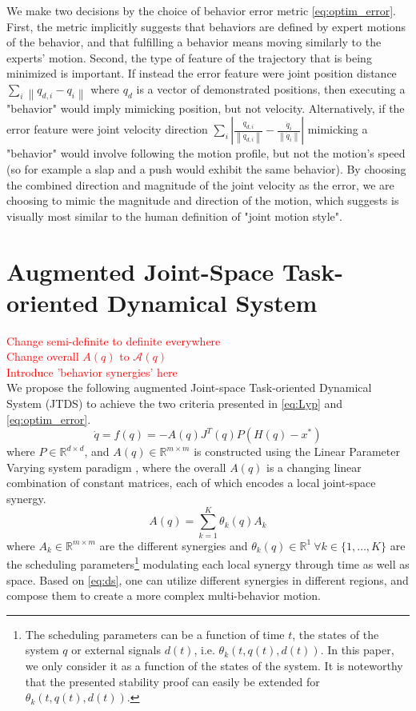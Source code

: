 \documentclass[letterpaper, 10 pt, conference,fleqn]{ieeeconf}
\begin{document}
We make two decisions by the choice of behavior error metric \eqref{eq:optim_error}. First, the metric implicitly suggests that behaviors are defined by expert motions of the behavior, and that fulfilling a behavior means moving similarly to the experts' motion. Second, the type of feature of the trajectory that is being minimized is important. If instead the error feature were joint position distance $\sum_i\left \| q_{d,i} - q_i \right \|$ where $q_d$ is a vector of demonstrated positions, then executing a "behavior" would imply mimicking position, but not velocity. Alternatively, if the error feature were joint velocity direction $\sum_i \left | \frac{\dot{q}_{d,i}}{\left \| \dot{q}_{d,i} \right \|} - \frac{\dot{q}_i}{\left \| \dot{q}_i \right \|} \right |$ mimicking a "behavior" would involve following the motion profile, but not the motion's speed (so for example a slap and a push would exhibit the same behavior). By choosing the combined direction and magnitude of the joint velocity as the error, we are choosing to mimic the magnitude and direction of the motion, which \cite{gielniak2010stylized} suggests is visually most similar to the human definition of "joint motion style".
\section{Augmented \textbf{J}oint-Space \textbf{T}ask-oriented \textbf{D}ynamical \textbf{S}ystem} \label{Sec:DS}
\label{sec:proposed_system}
\textcolor{red}{Change semi-definite to definite everywhere\\Change overall $A(q)$ to $\mathcal{A}(q)$\\ Introduce 'behavior synergies' here\\}
We propose the following augmented Joint-space Task-oriented Dynamical System (JTDS) to achieve the two criteria presented in \ref{eq:Lyp} and \ref{eq:optim_error}.
\begin{equation}
\label{eq:ds}
\dot{q} = f(q) = -A(q)J^T(q)P(H(q) - x^*)
\end{equation}
where $P\in \mathbb{R}^{d\times d}$, and $A(q)\in \mathbb{R}^{m\times m}$ is constructed using the Linear Parameter Varying system paradigm \cite{emedi2016fixed,7439839}, where the overall $A(q)$ is a changing linear combination of constant  matrices, each of which encodes a local joint-space synergy. 
\begin{equation}
\label{eq:A_def}
A(q) = \sum_{k=1}^{K}\theta_k(q)A_k 
\end{equation}
where $A_k\in \mathbb{R}^{m\times m} $ are the different synergies and $\theta_k(q)\in \mathbb{R}^{1}~\forall k\in\{1,\dots,K\} $ are the scheduling parameters\footnote{The scheduling parameters can be a function of time $t$, the states of the
system $q $ or external signals $d(t)$, i.e. $\theta_k (t, q(t), d(t))$. In this paper, we only consider it as a function of the states of the system. It is noteworthy that the presented stability proof can easily be extended for $\theta_k (t, q(t), d(t))$.} modulating each local synergy through time as well as space. Based on \eqref{eq:ds}, one can utilize different synergies in different regions, and compose them to create a more complex multi-behavior motion.
\end{document}
